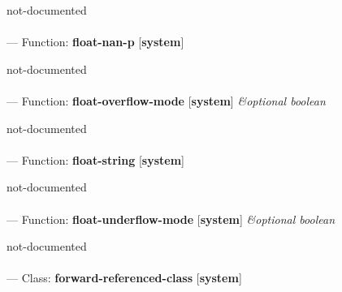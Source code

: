 \begin{adjustwidth}{5em}{5em}
not-documented
\end{adjustwidth}

\paragraph{}
\label{SYSTEM:FLOAT-NAN-P}
--- Function: \textbf{float-nan-p} [\textbf{system}] \textit{}

\begin{adjustwidth}{5em}{5em}
not-documented
\end{adjustwidth}

\paragraph{}
\label{SYSTEM:FLOAT-OVERFLOW-MODE}
--- Function: \textbf{float-overflow-mode} [\textbf{system}] \textit{\&optional boolean}

\begin{adjustwidth}{5em}{5em}
not-documented
\end{adjustwidth}

\paragraph{}
\label{SYSTEM:FLOAT-STRING}
--- Function: \textbf{float-string} [\textbf{system}] \textit{}

\begin{adjustwidth}{5em}{5em}
not-documented
\end{adjustwidth}

\paragraph{}
\label{SYSTEM:FLOAT-UNDERFLOW-MODE}
--- Function: \textbf{float-underflow-mode} [\textbf{system}] \textit{\&optional boolean}

\begin{adjustwidth}{5em}{5em}
not-documented
\end{adjustwidth}

\paragraph{}
\label{SYSTEM:FORWARD-REFERENCED-CLASS}
--- Class: \textbf{forward-referenced-class} [\textbf{system}] \textit{}

